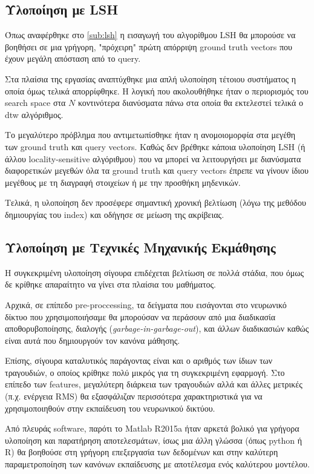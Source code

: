 \subsection{Υλοποίηση με LSH}
Όπως αναφέρθηκε στο \ref{sub:lsh} η εισαγωγή του αλγορίθμου LSH θα μπορούσε να βοηθήσει σε μια γρήγορη, "πρόχειρη" πρώτη απόρριψη ground truth vectors που έχουν μεγάλη απόσταση από το query.

Στα πλαίσια της εργασίας αναπτύχθηκε μια απλή υλοποίηση τέτοιου συστήματος η οποία όμως τελικά απορρίφθηκε.
Η λογική που ακολουθήθηκε ήταν ο περιορισμός του search space στα $N$ κοντινότερα διανύσματα πάνω στα οποία θα εκτελεστεί τελικά ο dtw αλγόριθμος.

Το μεγαλύτερο πρόβλημα που αντιμετωπίσθηκε ήταν η ανομοιομορφία στα μεγέθη των ground truth και query vectors.
Καθώς δεν βρέθηκε κάποια υλοποίηση LSH (ή άλλου locality-sensitive αλγόριθμου) που να μπορεί να λειτουργήσει με διανύσματα διαφορετικών μεγεθών όλα τα ground truth και query vectors έπρεπε να γίνουν ίδιου μεγέθους με τη διαγραφή στοιχείων ή με την προσθήκη μηδενικών.

Τελικά, η υλοποίηση δεν προσέφερε σημαντική χρονική βελτίωση (λόγω της μεθόδου δημιουργίας του index) και οδήγησε σε μείωση της ακρίβειας.

\subsection{Υλοποίηση με Τεχνικές Μηχανικής Εκμάθησης}
Η συγκεκριμένη υλοποίηση σίγουρα επιδέχεται βελτίωση σε πολλά στάδια, που όμως δε κρίθηκε απαραίτητο να γίνει στα πλαίσια του μαθήματος. 

Αρχικά, σε επίπεδο pre-proccessing, τα δείγματα που εισάγονται στο νευρωνικό δίκτυο που χρησιμοποιήσαμε θα μπορούσαν να περάσουν από μια διαδικασία αποθορυβοποίησης, διαλογής (\textit{garbage-in-garbage-out}), και άλλων διαδικασιών καθώς είναι αυτά που δημιουργούν τον κανόνα μάθησης.

Επίσης, σίγουρα καταλυτικός παράγοντας είναι και ο αριθμός των ίδιων των τραγουδιών, ο οποίος κρίθηκε πολύ μικρός για τη συγκεκριμένη εφαρμογή. 
Στο επίπεδο των features, μεγαλύτερη διάρκεια των τραγουδιών αλλά και άλλες μετρικές (π.χ. ενέργεια RMS) θα εξασφάλιζαν περισσότερα χαρακτηριστικά για να χρησιμοποιηθούν στην εκπαίδευση του νευρωνικού δικτύου.

Από πλευράς software, παρότι το Matlab R2015a \cite{matlab} ήταν αρκετά βολικό για γρήγορα υλοποίηση και παρατήρηση αποτελεσμάτων, ίσως μια άλλη γλώσσα (όπως python ή R) θα βοηθούσε στη γρήγορη επεξεργασία των δεδομένων και στην καλύτερη παραμετροποίηση των κανόνων εκπαίδευσης με αποτέλεσμα ενός καλύτερου μοντέλου.